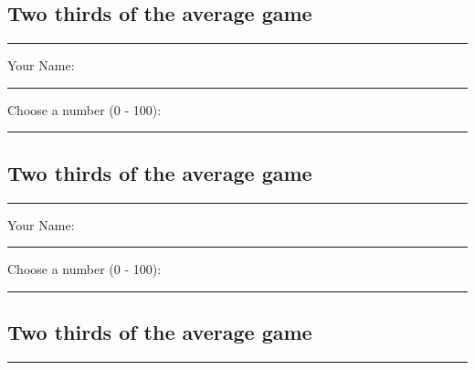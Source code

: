\documentclass{article}
\begin{document}
\thispagestyle{empty}

\begin{center}
    \section*{Two thirds of the average game}
    \rule{0.5\textwidth}{.4pt}
\end{center}

\vspace{10mm}

Your Name:

\vspace{3mm}

\hrule

\vspace{10mm}

Choose a number (0 - 100):

\vspace{3mm}

\hrule






\vspace{20mm}

\begin{center}
    \section*{Two thirds of the average game}
    \rule{0.5\textwidth}{.4pt}
\end{center}

\vspace{10mm}

Your Name:

\vspace{3mm}

\hrule

\vspace{10mm}

Choose a number (0 - 100):

\vspace{3mm}

\hrule







\vspace{20mm}

\begin{center}
    \section*{Two thirds of the average game}
    \rule{0.5\textwidth}{.4pt}
\end{center}
\end{document}
